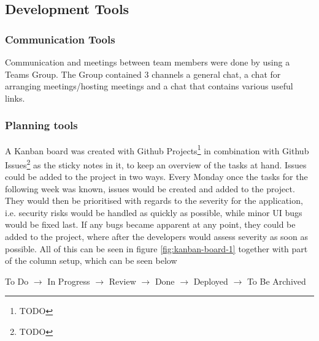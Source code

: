 \documentclass[report/main.tex]{subfiles}
\begin{document}
        \subsection{Development Tools}
        \label{subsec:development-tools}
            \subsubsection{Communication Tools}
            \label{subsubsec:communication-tools}
                Communication and meetings between team members were done by using a Teams Group. The Group contained 3 channels a general chat, a chat for arranging meetings/hosting meetings and a chat that contains various useful links. %
                
            \subsubsection{Planning tools}
            \label{subsubsec:planning-tools}
                A Kanban board was created with Github Projects\footnote{TODO} in combination with Github Issues\footnote{TODO} as the sticky notes in it, to keep an overview of the tasks at hand. Issues could be added to the project in two ways. Every Monday once the tasks for the following week was known, issues would be created and added to the project. They would then be prioritised with regards to the severity for the application, i.e. security risks would be handled as quickly as possible, while minor UI bugs would be fixed last. If any bugs became apparent at any point, they could be added to the project, where after the developers would assess severity as soon as possible. All of this can be seen in figure \ref{fig:kanban-board-1}  together with part of the column setup, which can be seen below
                
                \begin{center}
                    To Do $\longrightarrow$ In Progress $\longrightarrow$ Review $\longrightarrow$ Done $\longrightarrow$ Deployed $\longrightarrow$ To Be Archived
                \end{center}
                
\end{document}
